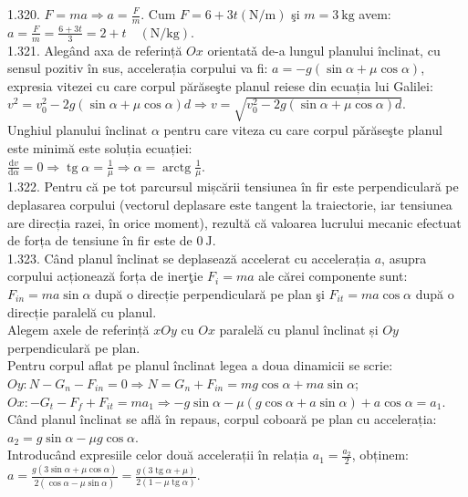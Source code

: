 1.320. $F=m a \Rightarrow a=\frac{F}{m}$. Cum $F=6+3 t(\mathrm{N} / \mathrm{m})$ şi $m=3 \mathrm{~kg}$ avem:\\ $a=\frac{F}{m}=\frac{6+3 t}{3}=2+t \quad(\mathrm{N} / \mathrm{kg})$.\\

1.321. Alegând axa de referință $Ox$ orientatǎ de-a lungul planului înclinat, cu sensul pozitiv în sus, accelerația corpului va fi: $a=-g(\sin \alpha+\mu \cos \alpha)$, expresia vitezei cu care corpul părăseşte planul reiese din ecuația lui Galilei:\\ $v^{2}=v_{0}^{2}-2 g(\sin \alpha+\mu \cos \alpha) d \Rightarrow v=\sqrt{v_{0}^{2}-2 g(\sin \alpha+\mu \cos \alpha) d}$.\\ Unghiul planului înclinat $\alpha$ pentru care viteza cu care corpul pǎrăseşte planul este minimă este soluția ecuației:\\ $\frac{\mathrm{d} v}{\mathrm{d} \alpha}=0 \Rightarrow \operatorname{tg} \alpha=\frac{1}{\mu} \Rightarrow \alpha=\operatorname{arctg} \frac{1}{\mu}$.\\

1.322. Pentru că pe tot parcursul mișcării tensiunea în fir este perpendiculară pe deplasarea corpului (vectorul deplasare este tangent la traiectorie, iar tensiunea are direcția razei, în orice moment), rezultă că valoarea lucrului mecanic efectuat de forța de tensiune în fir este de $0 \mathrm{~J}$.\\

1.323. Când planul înclinat se deplasează accelerat cu accelerația $a$, asupra corpului acționează forța de inerţie $F_{i}=m a$ ale cărei componente sunt: $F_{in}=m a \sin \alpha$ după o direcție perpendiculară pe plan şi $F_{it}=m a \cos \alpha$ după o direcție paralelă cu planul.\\ Alegem axele de referință $xOy$ cu $Ox$ paralelă cu planul înclinat și $Oy$ perpendiculară pe plan.\\ Pentru corpul aflat pe planul înclinat legea a doua dinamicii se scrie:\\ $Oy: N-G_{n}-F_{i n}=0 \Rightarrow N=G_{n}+F_{i n}=m g \cos \alpha+m a \sin \alpha$;\\ $Ox:-G_{t}-F_{f}+F_{i t}=m a_{1} \Rightarrow-g \sin \alpha-\mu(g \cos \alpha+a \sin \alpha)+a \cos \alpha=a_{1}$.\\ Când planul înclinat se află în repaus, corpul coboară pe plan cu accelerația:\\ $a_{2}=g \sin \alpha-\mu g \cos \alpha$.\\ Introducând expresiile celor două accelerații în relația $a_{1}=\frac{a_{2}}{2}$, obținem:\\ $a=\frac{g(3 \sin \alpha+\mu \cos \alpha)}{2(\cos \alpha-\mu \sin \alpha)}=\frac{g(3 \operatorname{tg} \alpha+\mu)}{2(1-\mu \operatorname{tg} \alpha)}$.\\

